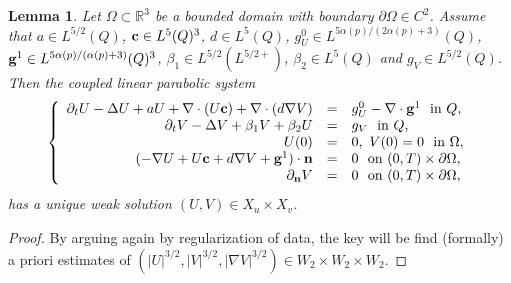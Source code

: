 \documentclass[11pt,reqno]{amsart}%
\newtheorem{lemma}[theorem]{Lemma}
\numberwithin{equation}{section}
\begin{document}
{ \begin{lemma}\label{corol-A}
Let %
$\Omega\subset\mathbb{R}^3$ be a bounded domain with boundary $\partial\Omega\in C^2$. 
Assume that 
$ a\in L^{5/2}(Q)$,
${\bf c}\in L^5(Q)^3$, 
$d\in L^5(Q)$, 
$g^0_U\in L^{5\alpha(p)/(2\alpha(p)+3)} (Q)$,
${\bf g}^1\in L^{5\alpha(p)/(\alpha(p)+3)}(Q)^3$, 
 $\beta_1\in L^{5/2}(L^{5/2+})$,  
 $\beta_2\in L^{5}(Q)$  and  $g_V\in L^{5/2}(Q)$.  %
 Then the coupled linear parabolic system  
\begin{equation}\label{corol-A-1}
\left\{
\begin{array}{rcl}\partial_tU-\Delta U+aU+\nabla\cdot(U{\bf c})+\nabla\cdot(d\nabla V)&=&g^0_U-\nabla\cdot{\bf g}^1\ \mbox{ in } Q,\\
\partial_tV-\Delta V+\beta_1V+\beta_2U&=&g_V\ \mbox{ in } Q,\\
U(0)&=&0,\ V(0)=0\ \mbox{ in } \Omega,\\
(-\nabla U+U{\bf c}+d\nabla V +{\bf g}^1)\cdot{\bf n}&=&0\ \mbox{ on } (0,T)\times\partial\Omega,\\
\partial_{\bf n}V&=&0\ \mbox{ on } (0,T)\times\partial\Omega,
\end{array}
\right.
\end{equation}
has a unique weak solution $(U,V)\in X_u\times X_v$.

\end{lemma}
\begin{proof}
By arguing again by regularization of data, the key will be find (formally) a priori estimates of 
$(|U|^{3/2},|V|^{3/2},|\nabla V|^{3/2})\in W_2\times W_2 \times W_2$.





\end{proof}}
\end{document}
